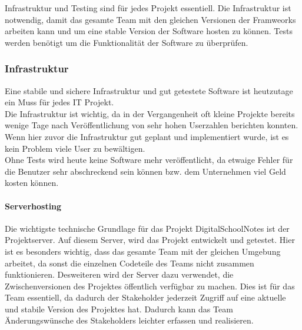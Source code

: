 
Infrastruktur und Testing sind für jedes Projekt essentiell. Die Infrastruktur ist notwendig, damit das gesamte Team mit den gleichen Versionen der Framweorks arbeiten kann und um eine stable Version der Software hosten zu können. Tests werden benötigt um die Funktionalität der Software zu überprüfen.
\subsubsection{Infrastruktur}
Eine stabile und sichere Infrastruktur und gut getestete Software ist heutzutage ein Muss für jedes IT Projekt. \\
Die Infrastruktur ist wichtig, da in der Vergangenheit oft kleine Projekte bereits wenige Tage nach Veröffentlichung von sehr hohen Userzahlen berichten konnten. Wenn hier zuvor die Infrastruktur gut geplant und implementiert wurde, ist es kein Problem viele User zu bewältigen.\\ 
Ohne Tests wird heute keine Software mehr veröffentlicht, da etwaige Fehler für die Benutzer sehr abschreckend sein können bzw. dem Unternehmen viel Geld kosten können.
\paragraph{Serverhosting}
Die wichtigste technische Grundlage für das Projekt DigitalSchoolNotes ist der Projektserver. Auf diesem Server, wird das Projekt entwickelt und getestet. Hier ist es besonders wichtig, dass das gesamte Team mit der gleichen Umgebung arbeitet, da sonst die einzelnen Codeteile des Teams nicht zusammen funktionieren. Desweiteren wird der Server dazu verwendet, die Zwischenversionen des Projektes öffentlich verfügbar zu machen. Dies ist für das Team essentiell, da dadurch der \gls{Stakeholder} jederzeit Zugriff auf eine aktuelle und stabile Version des Projektes hat. Dadurch kann das Team Änderungswünsche des Stakeholders leichter erfassen und realisieren.\\

